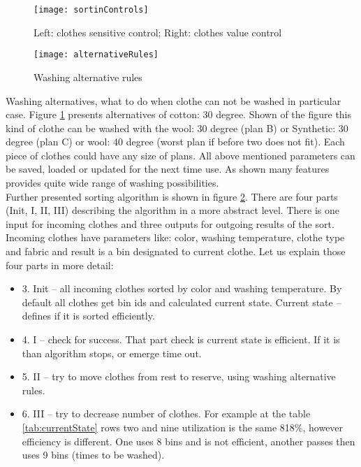 \begin{figure}[h]
	\centering
		\texttt{[image: sortinControls]}
	\caption{Left: clothes sensitive control; Right: clothes value control}
	\label{fig:sortinControls}
\end{figure}

\begin{figure}[h]
	\centering
		\texttt{[image: alternativeRules]}
	\caption{Washing alternative rules}
	\label{fig:alternativeRules}
\end{figure}

Washing alternatives, what to do when clothe can not be washed in particular case. Figure \ref{fig:sortinControls} presents alternatives of cotton: 30 degree. Shown of the figure this kind of clothe can be washed with the wool: 30 degree (plan B) or Synthetic: 30 degree (plan C) or wool: 40 degree (worst plan if before two does not fit). Each piece of clothes could have any size of plans. All above mentioned parameters can be saved, loaded or updated for the next time use. As shown many features provides quite wide range of washing possibilities.
\\
Further presented sorting algorithm is shown in figure \ref{fig:alternativeRules}. There are four parts (Init, I, II, III) describing the algorithm in a more abstract level. There is one input for incoming clothes and three outputs for outgoing results of the sort. Incoming clothes have parameters like: color, washing temperature, clothe type and fabric and result is a bin designated to current clothe.  Let us explain those four parts in more detail:

\begin{itemize}
	\item 3. Init – all incoming clothes sorted by color and washing temperature. By default all clothes get bin ids and calculated current state. Current state – defines if it is sorted efficiently.
	\item 4. I – check for success. That part check is current state is efficient. If it is than algorithm stops, or emerge time out.
	\item 5. II – try to move clothes from rest to reserve, using washing alternative rules. 
	\item 6. III – try to decrease number of clothes. For example at the table \ref{tab:currentState} rows two and nine utilization is the same 818\%, however efficiency is different. One uses 8 bins and is not efficient, another passes then uses 9 bins (times to be washed).
\end{itemize}

